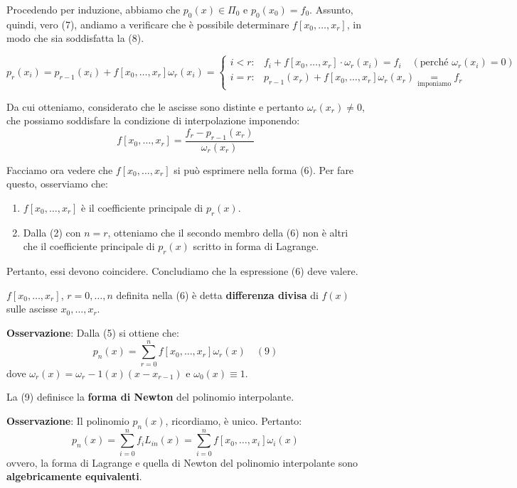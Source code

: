 Procedendo per induzione, abbiamo che $p_0(x) \in \Pi_0$ e $p_0(x_0) = f_0$.
Assunto, quindi, vero (7), andiamo a verificare che è possibile determinare $f[x_0, \dots, x_r]$, in modo che sia soddisfatta la (8).

$$
p_r(x_i) = p_{r-1}(x_i) + f[x_0, \dots, x_r]\omega_r(x_i) = 
\begin{cases} 
i < r: & f_i + f[x_0, \dots, x_r] \cdot \omega_r(x_i) = f_i \quad (\text{perché } \omega_r(x_i) = 0) \\
i = r: & p_{r-1}(x_r) + f[x_0, \dots, x_r]\omega_r(x_r) \underset{\text{imponiamo}}{=} f_r 
\end{cases}
$$

Da cui otteniamo, considerato che le ascisse sono distinte e pertanto $\omega_r(x_r) \neq 0$, che possiamo soddisfare la condizione di interpolazione imponendo:
$$f[x_0, \dots, x_r] = \frac{f_r - p_{r-1}(x_r)}{\omega_r(x_r)}$$

Facciamo ora vedere che $f[x_0, \dots, x_r]$ si può esprimere nella forma (6). Per fare questo, osserviamo che:
\begin{enumerate}
    \item $f[x_0, \dots, x_r]$ è il coefficiente principale di $p_r(x)$.
    \item Dalla (2) con $n=r$, otteniamo che il secondo membro della (6) non è altri che il coefficiente principale di $p_r(x)$ scritto in forma di Lagrange.
\end{enumerate}
Pertanto, essi devono coincidere. Concludiamo che la espressione (6) deve valere.

\begin{definition}
$f[x_0, \dots, x_r]$, $r=0, \dots, n$ definita nella (6) è detta \textbf{differenza divisa} di $f(x)$ sulle ascisse $x_0, \dots, x_r$.
\end{definition}

\textbf{Osservazione}: Dalla (5) si ottiene che:
$$p_n(x) = \sum_{r=0}^{n} f[x_0, \dots, x_r] \omega_r(x) \quad (9)$$ dove $\omega_r(x) = \omega_r-1(x)(x-x_{r-1})$ e $\omega_0(x) \equiv 1$.

\begin{definition}
La (9) definisce la \textbf{forma di Newton} del polinomio interpolante.
\end{definition}

\textbf{Osservazione}: Il polinomio $p_n(x)$, ricordiamo, è unico. Pertanto:
$$p_n(x) = \sum_{i=0}^{n} f_i L_{in}(x) = \sum_{i=0}^{n} f[x_0, \dots, x_i] \omega_i(x)$$
ovvero, la forma di Lagrange e quella di Newton del polinomio interpolante sono \textbf{algebricamente equivalenti}.

